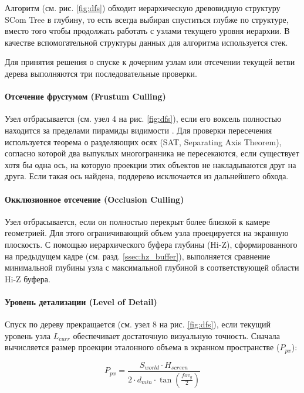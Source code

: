 Алгоритм (см. рис. \ref{fig:dfs}) обходит иерархическую древовидную структуру SCom Tree \cite{garifullin2025compact} в глубину, то есть всегда выбирая спуститься глубже по структуре, вместо того чтобы продолжать работать с узлами текущего уровня иерархии. В качестве вспомогательной структуры данных для алгоритма используется стек.

\newpage
Для принятия решения о спуске к дочерним узлам или отсечении текущей ветви дерева выполняются три последовательные проверки.

\paragraph{Отсечение фрустумом (Frustum Culling)} 
Узел отбрасывается (см. узел 4 на рис. \ref{fig:dfs}), если его воксель полностью находится за пределами пирамиды видимости \cite[с. 835]{RTR4}. Для проверки пересечения используется теорема о разделяющих осях (SAT, Separating Axis Theorem), согласно которой два выпуклых многогранника не пересекаются, если существует хотя бы одна ось, на которую проекции этих объектов не накладываются друг на друга. Если такая ось найдена, поддерево исключается из дальнейшего обхода.

\paragraph{Окклюзионное отсечение (Occlusion Culling)} 
Узел отбрасывается, если он полностью перекрыт более близкой к камере геометрией. Для этого ограничивающий объем узла проецируется на экранную плоскость. С помощью иерархического буфера глубины (Hi-Z), сформированного на предыдущем кадре (см. разд. \ref{ssec:hz_buffer}), выполняется сравнение минимальной глубины узла с максимальной глубиной в соответствующей области Hi-Z буфера.

\paragraph{Уровень детализации (Level of Detail)} 
Спуск по дереву прекращается (см. узел 8 на рис. \ref{fig:dfs}), если текущий уровень узла $L_{curr}$ обеспечивает достаточную визуальную точность. Сначала вычисляется размер проекции эталонного объема в экранном пространстве ($P_{px}$):

\begin{equation}
  P_{px} = \frac{S_{world} \cdot H_{screen}}{2 \cdot d_{min} \cdot \tan\left(\frac{{fov}_{y}}{2}\right)}
\end{equation}

